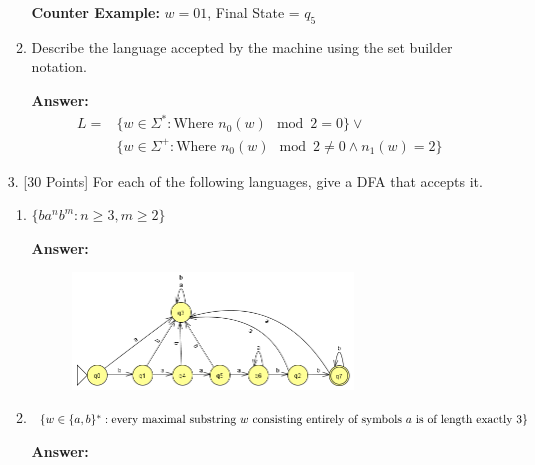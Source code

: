 \documentclass[12pt]{article}
\begin{document}
\begin{spacing}{1.5}
\begin{enumerate}
\begin{enumerate}
			            \textbf{Counter Example:} $w = 01$, Final State = $q_5$

			      \item Describe the language accepted by the machine using the set builder notation.

			            \noindent \textbf{Answer:}
			            \begin{equation}
				            \begin{split}
					            L = & \{w \in \Sigma^* : \text{Where } n_0(w) \mod 2 = 0 \} \lor \\ & \{w \in \Sigma^+ : \text{Where } n_0(w) \mod 2 \neq 0 \land n_1(w) = 2 \}
				            \end{split}
			            \end{equation}

		      \end{enumerate}

		      \newpage

		\item[3.] [30 Points] For each of the following languages, give a DFA that accepts it.

		      \begin{enumerate}
			      \item $\{ba^nb^m : n \geq 3, m \geq 2 \}$

			            \noindent \textbf{Answer:}

			            \begin{figure}[h!]
				            \centering
				            \includegraphics[width=0.75\textwidth]{img/q3/q3_a.png}
			            \end{figure}

			      \item $\{w \in \{a,b \}^* : \text{every maximal substring } w \text{ consisting entirely of symbols } a \\ \text{ is of length exactly 3} \}$

			            \noindent \textbf{Answer:}


\end{enumerate}
\end{enumerate}
\end{spacing}
\end{document}
